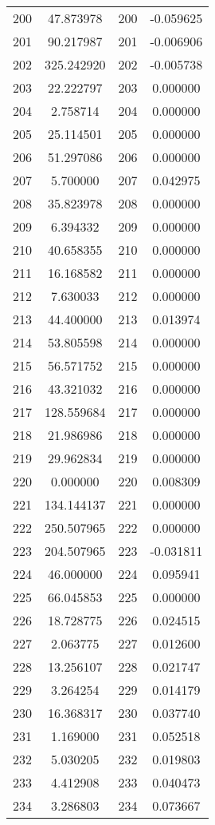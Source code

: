 \documentclass[12pt]{article}
\begin{document}
\begin{longtable}{@{}cccc@{}}
200 & 47.873978 & 200 & -0.059625 \\
201 & 90.217987 & 201 & -0.006906 \\
202 & 325.242920 & 202 & -0.005738 \\
203 & 22.222797 & 203 & 0.000000 \\
204 & 2.758714 & 204 & 0.000000 \\
205 & 25.114501 & 205 & 0.000000 \\
206 & 51.297086 & 206 & 0.000000 \\
207 & 5.700000 & 207 & 0.042975 \\
208 & 35.823978 & 208 & 0.000000 \\
209 & 6.394332 & 209 & 0.000000 \\
210 & 40.658355 & 210 & 0.000000 \\
211 & 16.168582 & 211 & 0.000000 \\
212 & 7.630033 & 212 & 0.000000 \\
213 & 44.400000 & 213 & 0.013974 \\
214 & 53.805598 & 214 & 0.000000 \\
215 & 56.571752 & 215 & 0.000000 \\
216 & 43.321032 & 216 & 0.000000 \\
217 & 128.559684 & 217 & 0.000000 \\
218 & 21.986986 & 218 & 0.000000 \\
219 & 29.962834 & 219 & 0.000000 \\
220 & 0.000000 & 220 & 0.008309 \\
221 & 134.144137 & 221 & 0.000000 \\
222 & 250.507965 & 222 & 0.000000 \\
223 & 204.507965 & 223 & -0.031811 \\
224 & 46.000000 & 224 & 0.095941 \\
225 & 66.045853 & 225 & 0.000000 \\
226 & 18.728775 & 226 & 0.024515 \\
227 & 2.063775 & 227 & 0.012600 \\
228 & 13.256107 & 228 & 0.021747 \\
229 & 3.264254 & 229 & 0.014179 \\
230 & 16.368317 & 230 & 0.037740 \\
231 & 1.169000 & 231 & 0.052518 \\
232 & 5.030205 & 232 & 0.019803 \\
233 & 4.412908 & 233 & 0.040473 \\
234 & 3.286803 & 234 & 0.073667 \\

\end{longtable}
\end{document}
